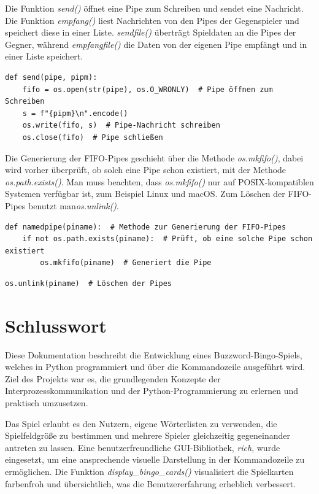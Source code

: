 \documentclass{llncs}
\begin{document}
Die Funktion \textit{send()} öffnet eine Pipe zum Schreiben und sendet eine Nachricht. Die Funktion \textit{empfang()} liest Nachrichten von den Pipes der Gegenspieler und speichert diese in einer Liste. \textit{sendfile()} überträgt Spieldaten an die Pipes der Gegner, während \textit{empfangfile()} die Daten von der eigenen Pipe empfängt und in einer Liste speichert.

\begin{lstlisting}[caption=Nachricht an Pipe senden]
def send(pipe, pipm):
    fifo = os.open(str(pipe), os.O_WRONLY)  # Pipe öffnen zum Schreiben
    s = f"{pipm}\n".encode()
    os.write(fifo, s)  # Pipe-Nachricht schreiben
    os.close(fifo)  # Pipe schließen
\end{lstlisting}


Die Generierung der FIFO-Pipes geschieht über die Methode  \textit{os.mkfifo()}, dabei wird vorher überprüft, ob solch eine Pipe schon existiert, mit der Methode  \textit{os.path.exists()}. 
Man muss beachten, dass  \textit{os.mkfifo()} nur auf POSIX-kompatiblen Systemen verfügbar ist, zum Beispiel Linux und macOS.
Zum Löschen der FIFO-Pipes benutzt man\textit{os.unlink()}.

\begin{lstlisting}[caption=FIFO-Pipe Erstellen]
def namedpipe(piname):  # Methode zur Generierung der FIFO-Pipes
    if not os.path.exists(piname):  # Prüft, ob eine solche Pipe schon existiert
        os.mkfifo(piname)  # Generiert die Pipe
\end{lstlisting}


\begin{lstlisting}[caption=FIFO-Pipe Entfernen]
  os.unlink(piname)  # Löschen der Pipes
\end{lstlisting}

\section{Schlusswort}

Diese Dokumentation beschreibt die Entwicklung eines Buzzword-Bingo-Spiels, welches in Python programmiert und über die Kommandozeile ausgeführt wird. Ziel des Projekts war es, die grundlegenden Konzepte der Interprozesskommunikation und der Python-Programmierung zu erlernen und praktisch umzusetzen.

Das Spiel erlaubt es den Nutzern, eigene Wörterlisten zu verwenden, die Spielfeldgröße zu bestimmen und mehrere Spieler gleichzeitig gegeneinander antreten zu lassen. Eine benutzerfreundliche GUI-Bibliothek, \textit{rich}, wurde eingesetzt, um eine ansprechende visuelle Darstellung in der Kommandozeile zu ermöglichen. Die Funktion \textit{display\_bingo\_cards()} visualisiert die Spielkarten farbenfroh und übersichtlich, was die Benutzererfahrung erheblich verbessert.
\end{document}
